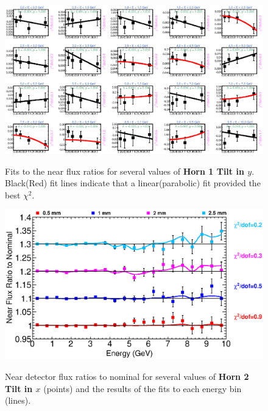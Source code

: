 {\begin{figure}[ht]
  \begin{center}
    {\includegraphics[width=5.0in]{figures/Horn1YTilt_near_fits.eps}}
  \end{center}
\caption{ Fits to the near flux ratios for several values of {\bf Horn 1 Tilt in $y$}. Black(Red) fit lines indicate that a linear(parabolic) fit provided the best $\chi^2$. }
\end{figure}

\clearpage

\begin{figure}[ht]
  \begin{center}
    {\includegraphics[width=6.0in]{figures/Horn2XTilt_near_summary.eps}}
  \end{center}
\caption{ Near detector flux ratios to nominal for several values of {\bf Horn 2 Tilt in $x$} (points) and the results of the fits to each energy bin (lines).}
\end{figure}

}
